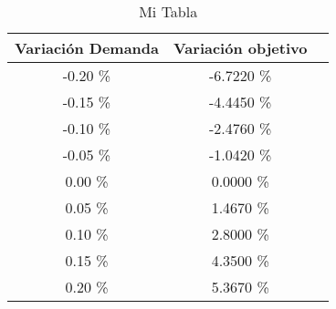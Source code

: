 \begin{table}
\centering
\begin{tabular}{|c|c|c|}
\hline
 Variación Demanda & Variación objetivo \\ \hline
-0.20 \% & -6.7220 \% \\ \hline
-0.15 \% & -4.4450 \% \\ \hline
-0.10 \% & -2.4760 \% \\ \hline
-0.05 \% & -1.0420 \% \\ \hline
0.00 \% & 0.0000 \% \\ \hline
0.05 \% & 1.4670 \% \\ \hline
0.10 \% & 2.8000 \% \\ \hline
0.15 \% & 4.3500 \% \\ \hline
0.20 \% & 5.3670 \% \\ \hline
\end{tabular}
\caption{Mi Tabla}
\end{table}
